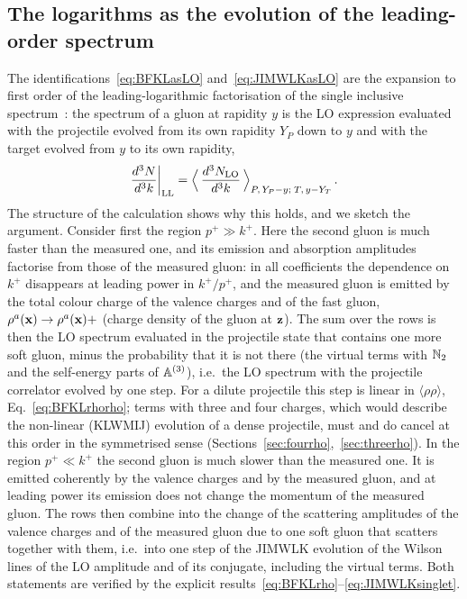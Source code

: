 \subsection{The logarithms as the evolution of the leading-order spectrum}\label{sec:proofsketch}\label{sec:logsummary}

The identifications~\eqref{eq:BFKLasLO} and~\eqref{eq:JIMWLKasLO} are the expansion to first order of the leading-logarithmic factorisation of the single inclusive spectrum~\cite{Kovner:2006wr,Kovner:2006ge,Gelis:2008rw}: the spectrum of a gluon at rapidity $y$ is the LO expression evaluated with the projectile evolved from its own rapidity $Y_P$ down to $y$ and with the target evolved from $y$ to its own rapidity,
\begin{align}\label{eq:LLfact}
\frac{d^3N}{d^3k}\bigg|_{\rm LL}=\Big\langle\,\frac{d^3N_{\rm LO}}{d^3k}\,\Big\rangle_{P,\,Y_P-y;\;T,\,y-Y_T}\,.
\end{align}
The structure of the calculation shows why this holds, and we sketch the argument. Consider first the region $p^+\gg k^+$. Here the second gluon is much faster than the measured one, and its emission and absorption amplitudes factorise from those of the measured gluon: in all coefficients the dependence on $k^+$ disappears at leading power in $k^+/p^+$, and the measured gluon is emitted by the total colour charge of the valence charges and of the fast gluon, $\rho^a(\mathbf{x})\to\rho^a(\mathbf{x})+$ (charge density of the gluon at $\mathbf{z}$). The sum over the rows is then the LO spectrum evaluated in the projectile state that contains one more soft gluon, minus the probability that it is not there (the virtual terms with $\mathbb{N}_2$ and the self-energy parts of $\mathbb{A}^{(3)}$), i.e.\ the LO spectrum with the projectile correlator evolved by one step. For a dilute projectile this step is linear in $\langle\rho\rho\rangle$, Eq.~\eqref{eq:BFKLrhorho}; terms with three and four charges, which would describe the non-linear (KLWMIJ) evolution of a dense projectile, must and do cancel at this order in the symmetrised sense (Sections~\ref{sec:fourrho},~\ref{sec:threerho}). In the region $p^+\ll k^+$ the second gluon is much slower than the measured one. It is emitted coherently by the valence charges and by the measured gluon, and at leading power its emission does not change the momentum of the measured gluon. The rows then combine into the change of the scattering amplitudes of the valence charges and of the measured gluon due to one soft gluon that scatters together with them, i.e.\ into one step of the JIMWLK evolution of the Wilson lines of the LO amplitude and of its conjugate, including the virtual terms. Both statements are verified by the explicit results~\eqref{eq:BFKLrho}--\eqref{eq:JIMWLKsinglet}.

